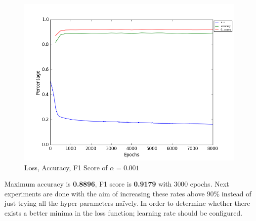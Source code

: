 \documentclass[conference]{IEEEtran}
\begin{document}
\begin{figure}[H]
	\includegraphics[width=1\columnwidth]{mix_plot.png}
	\caption{Loss, Accuracy, F1 Score of $\alpha = 0.001$}
	\label{mix}
\end{figure}

Maximum accuracy is \textbf{0.8896}, F1 score is \textbf{0.9179} with 3000 epochs. Next experiments are done with the aim of increasing these rates above 90\% instead of just trying all the hyper-parameters na\"ively. In order to determine whether there exists a better minima in the loss function; learning rate should be configured.\\
\end{document}
